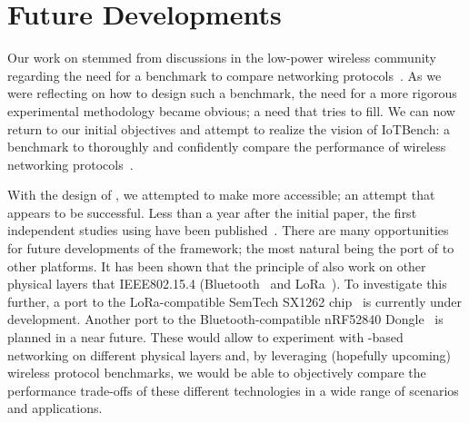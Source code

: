 \section{Future Developments}

Our work on \triscale stemmed from discussions in the low-power wireless community regarding the need for a benchmark to compare networking protocols~\cite{boano2018IoTBench}.
As we were reflecting on how to design such a benchmark, the need for a more rigorous experimental methodology became obvious; a need that \triscale tries to fill.
We can now return to our initial objectives and attempt to realize the vision of IoTBench: a benchmark to thoroughly and confidently compare the performance of wireless networking protocols~\cite{IoTBench_website}.

With the design of \baloo, we attempted to make \ST more accessible; an attempt that appears to be successful. Less than a year after the initial paper, the first independent studies using \baloo have been published~\cite{spina2019XPC}.
There are many opportunities for future developments of the framework; the most natural being the port of \baloo to other platforms.
It has been shown that the principle of \ST also work on other physical layers that IEEE802.15.4 (\eg Bluetooth~\cite{alnahas2019BlueFlood} and LoRa~\cite{wegmann2018Reliable}).
To investigate this further, a port to the LoRa-compatible SemTech SX1262 chip~\cite{semtechSX1262} is currently under development.
Another port to the Bluetooth-compatible nRF52840 Dongle~\cite{nRF52840} is planned in a near future.
%
These would allow to experiment with \ST-based networking on different physical layers and, by leveraging (hopefully upcoming) wireless protocol benchmarks, we would be able to objectively compare the performance trade-offs of these different technologies in a wide range of scenarios and applications.

\squarepar{%
  \fakepar{Dependable networking}
  One important limitation of the system designs presented in this dissertation is the reliance on a central authority, which we call \emph{host}, in order to coordinate communication within the network.
  This creates a single point of failure: if the host should fail (or be jammed), the entire network would stop its operation.
  For any safety-critical applications, this is not acceptable.
  It is therefore important to work on system designs that would ``distribute the responsibility'' of the host.
  Recent contributions provide consensus primitives in low-power networks~\cite{spina2019XPC, alnahas2019BlueFlood,poirot2019Paxos}, an important piece for fault-tolerance in distributed systems.
  However these works still rely on a central authority for elementary network functions, such as time synchronization.
  More efforts are required to designed truly dependable wireless networks.%
}

